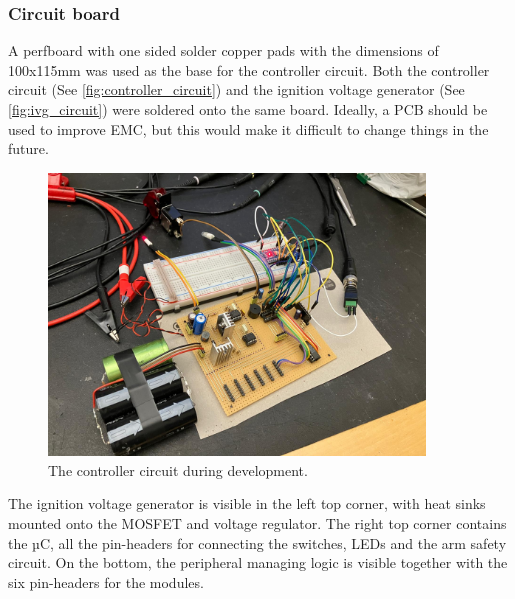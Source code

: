 
\pagebreak

\subsubsection{Circuit board}
\label{Circuitboard}

\noindent A perfboard with one sided solder copper pads with the dimensions of 100x115mm was used as the base for the controller circuit. Both the controller circuit (See \cref{fig:controller_circuit}) and the ignition voltage generator (See \cref{fig:ivg_circuit}) were soldered onto the same board. Ideally, a PCB should be used to improve EMC, but this would make it difficult to change things in the future. \\

\begin{figure}[!ht]
    \centering
    \includegraphics[width=10cm]{./Figures/dev_controller.jpeg}
    \caption{The controller circuit during development.}
    \label{fig:dev_controller}     
\end{figure}

\noindent The ignition voltage generator is visible in the left top corner, with heat sinks mounted onto the MOSFET and voltage regulator. The right top corner contains the µC, all the pin-headers for connecting the switches, LEDs and the arm safety circuit. On the bottom, the peripheral managing logic is visible together with the six pin-headers for the modules.

